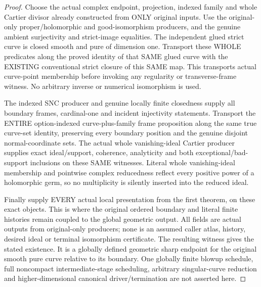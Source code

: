 \begin{proof}
Choose the actual complex endpoint, projection, indexed family and
whole Cartier divisor already constructed from ONLY original inputs.
Use the original-only proper/holomorphic and good-isomorphism producers,
and the genuine ambient surjectivity and strict-image equalities.
The independent glued strict curve is closed smooth and pure of
dimension one. Transport these WHOLE predicates along the proved
identity of that SAME glued curve with the EXISTING conventional
strict closure of this SAME map. This transports actual curve-point
membership before invoking any regularity or transverse-frame witness.
No arbitrary inverse or numerical isomorphism is used.

The indexed SNC producer and genuine locally finite closedness supply
all boundary frames, cardinal-one and incident injectivity statements.
Transport the ENTIRE option-indexed curve-plus-family frame proposition
along the same true curve-set identity, preserving every boundary
position and the genuine disjoint normal-coordinate sets. The actual
whole vanishing-ideal Cartier producer supplies exact ideal/support,
coherence, analyticity and both exceptional/bad-support inclusions on
these SAME witnesses. Literal whole vanishing-ideal membership and
pointwise complex reducedness reflect every positive power of a
holomorphic germ, so no multiplicity is silently inserted into the
reduced ideal.

Finally supply EVERY actual local presentation from the first theorem,
on these exact objects. This is where the original ordered boundary
and literal finite histories remain coupled to the global geometric
output. All fields are actual outputs from original-only producers;
none is an assumed caller atlas, history, desired ideal or terminal
isomorphism certificate. The resulting witness gives the stated
existence. It is a globally defined geometric sharp endpoint for the
original smooth pure curve relative to its boundary. One globally
finite blowup schedule, full noncompact intermediate-stage scheduling,
arbitrary singular-curve reduction and higher-dimensional canonical
driver/termination are not asserted here.
\end{proof}
